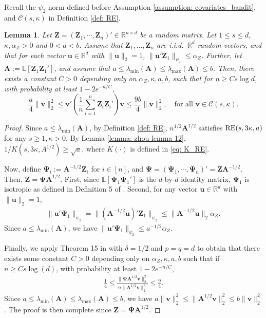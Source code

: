 \documentclass[aos,preprint]{imsart}
\theoremstyle{plain}
\newtheorem{lemma}[theorem]{Lemma}
\theoremstyle{definition}
\newcommand{\bd}[1]{\boldsymbol{#1}}
\newcommand{\lmin}[1]{\lambda_{\min}\left(#1\right)}
\newcommand{\lmax}[1]{\lambda_{\max}\left(#1\right)}
\newcommand{\mR}{\mathbb{R}}
\newcommand{\bA}{\boldsymbol{A}}
\newcommand{\mC}{\mathcal{C}}
\newcommand{\bu}{\boldsymbol{u}}
\newcommand{\bv}{\boldsymbol{v}}
\newcommand{\bZ}{\boldsymbol{Z}}
\newcommand{\bR}{\mathbb{R}}
\newcommand{\Exp}{\mathbb{E}}
\begin{document}
\begin{appendix}
Recall the $\psi_2$ norm defined before Assumption \ref{assumption: covariates_bandit}, and $\mC(s,\kappa)$  in Definition \ref{def: RE}.

\begin{lemma}\label{lemma: RE between population and design} 
Let $\bZ = (\bZ_1,\cdots,\bZ_n)'\in \mR^{n\times d}$
be a random matrix. Let $1 \leq s \leq d$, $\kappa, \alpha_Z >0$ and $0 < a< b$. Assume that $\bZ_1,\ldots,\bZ_n$ are i.i.d.~$\bR^d$-random vectors, and that for each vector $\bu \in \bR^{d}$ with $\|\bu\|_2 = 1$, $\|\bu'\bZ_1\|_{\psi_2} \leq \alpha_Z$. Further, let 
$\bA := \Exp[\bZ_1\bZ_1']$, and assume that 
$a\le \lmin{\bA} \le \lmax{\bA} \le b$. 
Then, there exists a constant $C>0$ depending only on $\alpha_Z,\kappa,a,b$, such that for $n\ge Cs\log d$, with probability at least $1-2e^{-n/C}$, 
$$\frac{a}{4}\|\bv\|_2^2\le  \bv'\left(\frac{1}{n}\sum_{i=1}^{n} \bZ_i \bZ_i'\right) \bv\le \frac{9b}{4}\|\bv\|_2^2,\quad \text{for all } \bv\in \mC(s,\kappa).$$
\end{lemma}

\begin{proof}
Since $a\le \lmin{\bA}$, by Definition \ref{def: RE}, 
$n^{1/2} \bA^{1/2}$ satisfies $\textup{RE}(s,3\kappa, a)$ for any $s \geq 1,\kappa>0$. By Lemma \ref{lemma: zhou lemma 12}, $1/K(s,3\kappa,A^{1/2}) \geq \sqrt{a}$, where $K(\cdot)$ is defined in \eqref{eq: K_RE}.

Now, define $\bd{\Psi}_i := \bA^{-1/2}\bZ_i$ for $i\in[n]$, and $\bd{\Psi}=(\bd{\Psi}_1,\cdots,\bd{\Psi}_n)'=\bZ \bA^{-1/2}$. Then, $\bZ = \bd{\Psi}\bA^{1/2} $. First, since  $\Exp[\bd{\Psi}_1 \bd{\Psi}_1']$ is the $d$-by-$d$ identity matrix,  $\bd{\Psi}_1$ is isotropic as defined in Definition 5 of \cite{pmlr-v23-rudelson12}. Second, for any vector $\bu \in \bR^{d}$ with $\|\bu\|_2 = 1$,
\begin{align*}
   \|\bu' \bd{\Psi}_1\|_{\psi_2} =    \|(\bA^{-1/2}\bu)' \bZ_1\|_{\psi_2} \leq \|\bA^{-1/2}\bu\|_{2} \alpha_{Z}.
\end{align*}
Since $a \leq \lmin{\bA}$, we have $\|\bu' \bd{\Psi}_1\|_{\psi_2} \leq a^{-1/2} \alpha_Z$. 

Finally, we apply Theorem 15 in \cite{pmlr-v23-rudelson12} with $\delta=1/2$ and $p = q = d$ to obtain that there exists some constant $C>0$ depending only on $\alpha_Z, \kappa,a,b$ such that if $n \geq Cs\log(d)$, with probability at least $1-2e^{-n/C}$,
\begin{align*}
    \frac{1}{4} \leq \frac{\|\bd{\Psi}\bA^{1/2} \bv\|_2^2}{n \|\bA^{1/2} \bv\|_2^2} \leq \frac{9}{4}.
\end{align*}
Since  
$a\le \lmin{\bA} \le \lmax{\bA} \le b$, we have $a \|\bv\|_2^2\leq \|\bA^{1/2} \bv\|_2^2 \leq b \|\bv\|_2^2$. The proof is then complete since $\bZ = \bd{\Psi}\bA^{1/2}$.
\end{proof}









\end{appendix}
\end{document}
